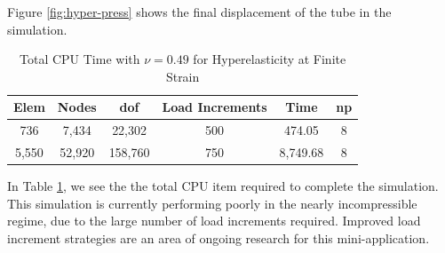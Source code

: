 Figure \ref{fig:hyper-press} shows the final displacement of the tube in the simulation.

\begin{table}[ht!]
\begin{center}
\begin{tabular}{c c c c c c} 
 \toprule
 Elem & Nodes & dof & Load Increments & Time & np \\ [0.5ex] 
 \midrule
736   &  7,434 &  22,302 & 500  &  474.05   & 8\\ 
5,550 & 52,920 & 158,760 & 750  &  8,749.68 & 8\\
 \bottomrule
\end{tabular}
\end{center}
\caption{Total CPU Time with $\nu = 0.49$ for Hyperelasticity at Finite Strain}
 \label{table:hyper-meshSizes}
\end{table}

In Table \ref{table:hyper-meshSizes}, we see the the total CPU item required to complete the simulation.
This simulation is currently performing poorly in the nearly incompressible regime, due to the large number of load increments required.
Improved load increment strategies are an area of ongoing research for this mini-application.